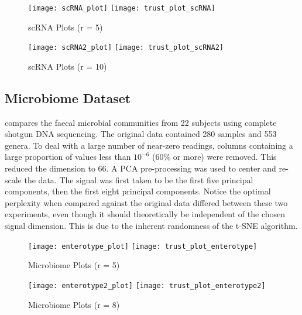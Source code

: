 \documentclass{article}
\begin{document}
\begin{figure}[H]
\centering
\texttt{[image: scRNA\_plot]}
\texttt{[image: trust\_plot\_scRNA]}
\caption{scRNA Plots (r = 5)}
\end{figure}

\begin{figure}[H]
\centering
\texttt{[image: scRNA2\_plot]}
\texttt{[image: trust\_plot\_scRNA2]}
\caption{scRNA Plots (r = 10)}
\end{figure}

\subsection{Microbiome Dataset}
\cite{enterotype data} compares the faecal microbial communities from 22 subjects using complete shotgun DNA sequencing. The original data contained 280 samples and 553 genera. To deal with a large number of near-zero readings, columns containing a large proportion of values less than $10^{-6}$ (60\% or more) were removed. This reduced the dimension to 66. A PCA pre-processing was used to center and re-scale the data. The signal was first taken to be the first five principal components, then the first eight principal components. Notice the optimal perplexity when compared against the original data differed between these two experiments, even though it should theoretically be independent of the chosen signal dimension. This is due to the inherent randomness of the t-SNE algorithm.

\begin{figure}[H]
\centering
\texttt{[image: enterotype\_plot]}
\texttt{[image: trust\_plot\_enterotype]}
\caption{Microbiome Plots (r = 5)}
\end{figure}

\begin{figure}[H]
\centering
\texttt{[image: enterotype2\_plot]}
\texttt{[image: trust\_plot\_enterotype2]}
\caption{Microbiome Plots (r = 8)}
\end{figure}



\end{document}

